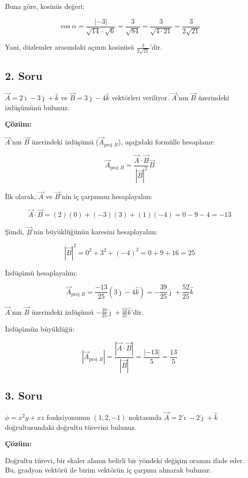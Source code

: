\documentclass[]{fenbil}
\begin{document}
Buna göre, kosinüs değeri:

\[
\cos{\alpha} = \frac{|-3|}{\sqrt{14} \cdot \sqrt{6}} = \frac{3}{\sqrt{84}} = \frac{3}{\sqrt{4 \cdot 21}} = \frac{3}{2\sqrt{21}}
\]

Yani, düzlemler arasındaki açının kosinüsü $\frac{3}{2\sqrt{21}}$'dir.

\subsection*{2. Soru}

$\vec{A} = 2\hat{\imath} - 3\hat{\jmath} + \hat{k}$ ve $\vec{B} = 3\hat{\jmath} - 4\hat{k}$ vektörleri veriliyor. $\vec{A}$'nın $\vec{B}$ üzerindeki izdüşümünü bulunuz.

\textbf{Çözüm:}

$\vec{A}$'nın $\vec{B}$ üzerindeki izdüşümü ($\vec{A}_{\text{proj } B}$), aşağıdaki formülle hesaplanır:

\[
\vec{A}_{\text{proj } B} = \frac{\vec{A} \cdot \vec{B}}{|\vec{B}|^2} \vec{B}
\]

İlk olarak, $\vec{A}$ ve $\vec{B}$'nin iç çarpımını hesaplayalım:

\[
\vec{A} \cdot \vec{B} = (2)(0) + (-3)(3) + (1)(-4) = 0 - 9 - 4 = -13
\]

Şimdi, $\vec{B}$'nin büyüklüğünün karesini hesaplayalım:

\[
|\vec{B}|^2 = 0^2 + 3^2 + (-4)^2 = 0 + 9 + 16 = 25
\]

İzdüşümü hesaplayalım:

\[
\vec{A}_{\text{proj } B} = \frac{-13}{25} (3\hat{\jmath} - 4\hat{k}) = -\frac{39}{25}\hat{\jmath} + \frac{52}{25}\hat{k}
\]

$\vec{A}$'nın $\vec{B}$ üzerindeki izdüşümü $-\frac{39}{25}\hat{\jmath} + \frac{52}{25}\hat{k}$'dir.

İzdüşümün büyüklüğü:

\[
|\vec{A}_{\text{proj } B}| = \frac{|\vec{A} \cdot \vec{B}|}{|\vec{B}|} = \frac{|-13|}{5} = \frac{13}{5}
\]

\subsection*{3. Soru}

$\phi = x^2y + xz$ fonksiyonunun $(1, 2, -1)$ noktasında $\vec{A} = 2\hat{\imath} - 2\hat{\jmath} + \hat{k}$ doğrultusundaki doğrultu türevini bulunuz.

\textbf{Çözüm:}

Doğrultu türevi, bir skaler alanın belirli bir yöndeki değişim oranını ifade eder. Bu, gradyan vektörü ile birim vektörün iç çarpımı alınarak bulunur.
\end{document}
